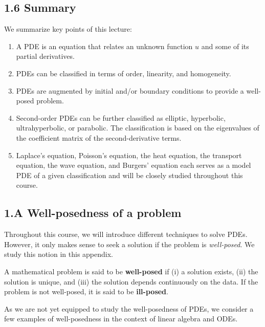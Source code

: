 \subsection{1.6 Summary}
We summarize key points of this lecture:
\begin{enumerate}
    \item A PDE is an equation that relates an unknown function $u$ and some of its partial derivatives.
    \item PDEs can be classified in terms of order, linearity, and homogeneity.
    \item PDEs are augmented by initial and/or boundary conditions to provide a well-posed problem.
    \item Second-order PDEs can be further classified as elliptic, hyperbolic, ultrahyperbolic, or parabolic. The classification is based on the eigenvalues of the coefficient matrix of the second-derivative terms.
    \item Laplace's equation, Poisson's equation, the heat equation, the transport equation, the wave equation, and Burgers' equation each serves as a model PDE of a given classification and will be closely studied throughout this course.
\end{enumerate}

\subsection{1.A Well-posedness of a problem}
Throughout this course, we will introduce different techniques to solve PDEs. However, it only makes sense to seek a solution if the problem is \textit{well-posed}. We study this notion in this appendix.

\begin{definition}
    A mathematical problem is said to be \textbf{well-posed} if (i) a solution exists, (ii) the solution is unique, and (iii) the solution depends continuously on the data. If the problem is not well-posed, it is said to be \textbf{ill-posed}.
\end{definition}

As we are not yet equipped to study the well-posedness of PDEs, we consider a few examples of well-posedness in the context of linear algebra and ODEs.

